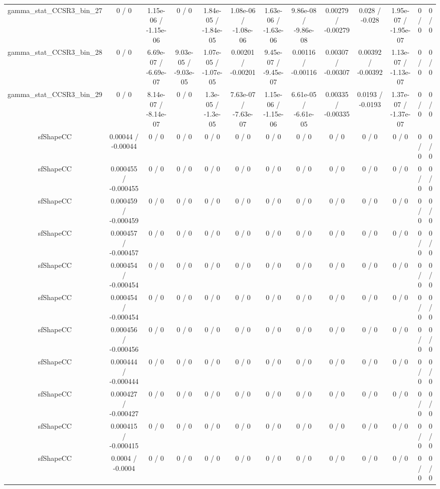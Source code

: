 \documentclass[10pt]{article}
\begin{document}
\begin{table}[htbp]
\begin{center}
\begin{tabular}{|c|c|c|c|c|c|c|c|c|c|c|c|c|}
  gamma_stat_CCSR3_bin_27 & 0 / 0 & 1.15e-06 / -1.15e-06 & 0 / 0 & 1.84e-05 / -1.84e-05 & 1.08e-06 / -1.08e-06 & 1.63e-06 / -1.63e-06 & 9.86e-08 / -9.86e-08 & 0.00279 / -0.00279 & 0.028 / -0.028 & 1.95e-07 / -1.95e-07 & 0 / 0 & 0 / 0 \\ 
  gamma_stat_CCSR3_bin_28 & 0 / 0 & 6.69e-07 / -6.69e-07 & 9.03e-05 / -9.03e-05 & 1.07e-05 / -1.07e-05 & 0.00201 / -0.00201 & 9.45e-07 / -9.45e-07 & 0.00116 / -0.00116 & 0.00307 / -0.00307 & 0.00392 / -0.00392 & 1.13e-07 / -1.13e-07 & 0 / 0 & 0 / 0 \\ 
  gamma_stat_CCSR3_bin_29 & 0 / 0 & 8.14e-07 / -8.14e-07 & 0 / 0 & 1.3e-05 / -1.3e-05 & 7.63e-07 / -7.63e-07 & 1.15e-06 / -1.15e-06 & 6.61e-05 / -6.61e-05 & 0.00335 / -0.00335 & 0.0193 / -0.0193 & 1.37e-07 / -1.37e-07 & 0 / 0 & 0 / 0 \\ 
  sfShapeCC & 0.00044 / -0.00044 & 0 / 0 & 0 / 0 & 0 / 0 & 0 / 0 & 0 / 0 & 0 / 0 & 0 / 0 & 0 / 0 & 0 / 0 & 0 / 0 & 0 / 0 \\ 
  sfShapeCC & 0.000455 / -0.000455 & 0 / 0 & 0 / 0 & 0 / 0 & 0 / 0 & 0 / 0 & 0 / 0 & 0 / 0 & 0 / 0 & 0 / 0 & 0 / 0 & 0 / 0 \\ 
  sfShapeCC & 0.000459 / -0.000459 & 0 / 0 & 0 / 0 & 0 / 0 & 0 / 0 & 0 / 0 & 0 / 0 & 0 / 0 & 0 / 0 & 0 / 0 & 0 / 0 & 0 / 0 \\ 
  sfShapeCC & 0.000457 / -0.000457 & 0 / 0 & 0 / 0 & 0 / 0 & 0 / 0 & 0 / 0 & 0 / 0 & 0 / 0 & 0 / 0 & 0 / 0 & 0 / 0 & 0 / 0 \\ 
  sfShapeCC & 0.000454 / -0.000454 & 0 / 0 & 0 / 0 & 0 / 0 & 0 / 0 & 0 / 0 & 0 / 0 & 0 / 0 & 0 / 0 & 0 / 0 & 0 / 0 & 0 / 0 \\ 
  sfShapeCC & 0.000454 / -0.000454 & 0 / 0 & 0 / 0 & 0 / 0 & 0 / 0 & 0 / 0 & 0 / 0 & 0 / 0 & 0 / 0 & 0 / 0 & 0 / 0 & 0 / 0 \\ 
  sfShapeCC & 0.000456 / -0.000456 & 0 / 0 & 0 / 0 & 0 / 0 & 0 / 0 & 0 / 0 & 0 / 0 & 0 / 0 & 0 / 0 & 0 / 0 & 0 / 0 & 0 / 0 \\ 
  sfShapeCC & 0.000444 / -0.000444 & 0 / 0 & 0 / 0 & 0 / 0 & 0 / 0 & 0 / 0 & 0 / 0 & 0 / 0 & 0 / 0 & 0 / 0 & 0 / 0 & 0 / 0 \\ 
  sfShapeCC & 0.000427 / -0.000427 & 0 / 0 & 0 / 0 & 0 / 0 & 0 / 0 & 0 / 0 & 0 / 0 & 0 / 0 & 0 / 0 & 0 / 0 & 0 / 0 & 0 / 0 \\ 
  sfShapeCC & 0.000415 / -0.000415 & 0 / 0 & 0 / 0 & 0 / 0 & 0 / 0 & 0 / 0 & 0 / 0 & 0 / 0 & 0 / 0 & 0 / 0 & 0 / 0 & 0 / 0 \\ 
  sfShapeCC & 0.0004 / -0.0004 & 0 / 0 & 0 / 0 & 0 / 0 & 0 / 0 & 0 / 0 & 0 / 0 & 0 / 0 & 0 / 0 & 0 / 0 & 0 / 0 & 0 / 0 \\ 

\end{tabular}
\end{center}
\end{table}
\end{document}
